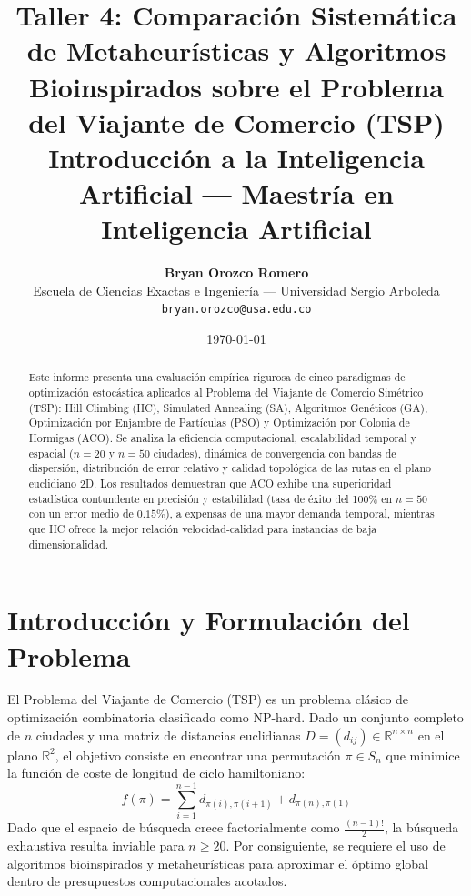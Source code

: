 \documentclass[11pt, a4paper]{article}
\title{\textbf{Taller 4: Comparación Sistemática de Metaheurísticas y Algoritmos Bioinspirados sobre el Problema del Viajante de Comercio (TSP)}\\[0.3em]
\large Introducción a la Inteligencia Artificial --- Maestría en Inteligencia Artificial}
\author{\textbf{Bryan Orozco Romero}\\ 
\small Escuela de Ciencias Exactas e Ingeniería --- Universidad Sergio Arboleda\\
\small \texttt{bryan.orozco@usa.edu.co}}
\date{\today}
\begin{document}
\maketitle

\begin{abstract}
Este informe presenta una evaluación empírica rigurosa de cinco paradigmas de optimización estocástica aplicados al Problema del Viajante de Comercio Simétrico (TSP): Hill Climbing (HC), Simulated Annealing (SA), Algoritmos Genéticos (GA), Optimización por Enjambre de Partículas (PSO) y Optimización por Colonia de Hormigas (ACO). Se analiza la eficiencia computacional, escalabilidad temporal y espacial ($n=20$ y $n=50$ ciudades), dinámica de convergencia con bandas de dispersión, distribución de error relativo y calidad topológica de las rutas en el plano euclidiano 2D. Los resultados demuestran que ACO exhibe una superioridad estadística contundente en precisión y estabilidad (tasa de éxito del 100\% en $n=50$ con un error medio de $0.15\%$), a expensas de una mayor demanda temporal, mientras que HC ofrece la mejor relación velocidad-calidad para instancias de baja dimensionalidad.
\end{abstract}

\section{Introducción y Formulación del Problema}
El Problema del Viajante de Comercio (TSP) es un problema clásico de optimización combinatoria clasificado como NP-hard. Dado un conjunto completo de $n$ ciudades y una matriz de distancias euclidianas $D = (d_{ij}) \in \mathbb{R}^{n \times n}$ en el plano $\mathbb{R}^2$, el objetivo consiste en encontrar una permutación $\pi \in S_n$ que minimice la función de coste de longitud de ciclo hamiltoniano:
\begin{equation}
f(\pi) = \sum_{i=1}^{n-1} d_{\pi(i), \pi(i+1)} + d_{\pi(n), \pi(1)}
\end{equation}
Dado que el espacio de búsqueda crece factorialmente como $\frac{(n-1)!}{2}$, la búsqueda exhaustiva resulta inviable para $n \ge 20$. Por consiguiente, se requiere el uso de algoritmos bioinspirados y metaheurísticas para aproximar el óptimo global dentro de presupuestos computacionales acotados.
\end{document}
